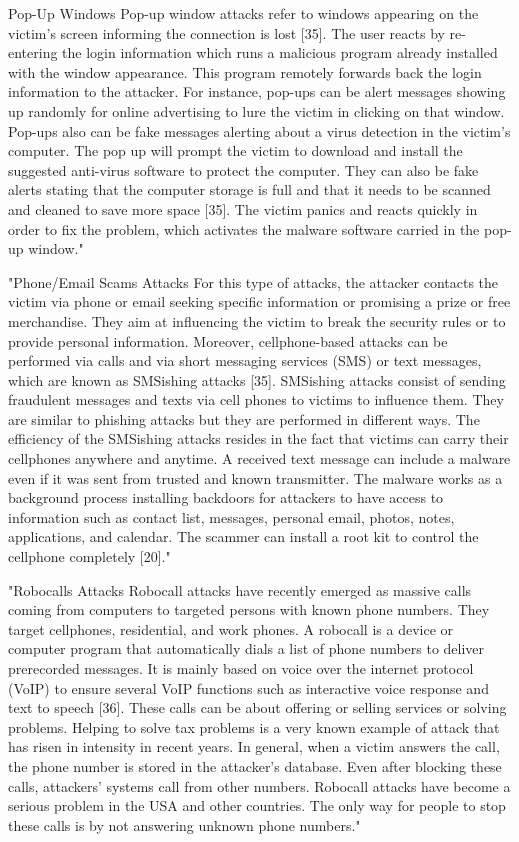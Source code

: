 Pop-Up Windows
Pop-up window attacks refer to windows appearing on the victim’s screen informing the connection is lost [35]. The user reacts by re-entering the login information
 which runs a malicious program already installed with the window appearance. This program remotely forwards back the login information to the attacker. For instance,
 pop-ups can be alert messages showing up randomly for online advertising to lure the victim in clicking on that window. Pop-ups also can be fake messages alerting about
 a virus detection in the victim’s computer. The pop up will prompt the victim to download and install the suggested anti-virus software to protect the computer. They can
 also be fake alerts stating that the computer storage is full and that it needs to be scanned and cleaned to save more space [35]. The victim panics and reacts quickly in
 order to fix the problem, which activates the malware software carried in the pop-up window."\cite{4_mdpi}

"Phone/Email Scams Attacks
For this type of attacks, the attacker contacts the victim via phone or email seeking specific information or promising a prize or free merchandise.
They aim at influencing the victim to break the security rules or to provide personal information. Moreover, cellphone-based attacks can be performed
via calls and via short messaging services (SMS) or text messages, which are known as SMSishing attacks [35]. SMSishing attacks consist of sending fraudulent
messages and texts via cell phones to victims to influence them. They are similar to phishing attacks but they are performed in different ways. The efficiency of
the SMSishing attacks resides in the fact that victims can carry their cellphones anywhere and anytime. A received text message can include a malware even if it was
sent from trusted and known transmitter. The malware works as a background process installing backdoors for attackers to have access to information such as contact list,
messages, personal email, photos, notes, applications, and calendar. The scammer can install a root kit to control the cellphone completely [20]."\cite{4_mdpi}

"Robocalls Attacks
Robocall attacks have recently emerged as massive calls coming from computers to targeted persons with known phone numbers. They target cellphones, residential,
and work phones. A robocall is a device or computer program that automatically dials a list of phone numbers to deliver prerecorded messages. It is mainly based on
voice over the internet protocol (VoIP) to ensure several VoIP functions such as interactive voice response and text to speech [36]. These calls can be about offering
or selling services or solving problems. Helping to solve tax problems is a very known example of attack that has risen in intensity in recent years. In general, when
a victim answers the call, the phone number is stored in the attacker’s database. Even after blocking these calls, attackers’ systems call from other numbers. Robocall
attacks have become a serious problem in the USA and other countries. The only way for people to stop these calls is by not answering unknown phone numbers."\cite{4_mdpi}

